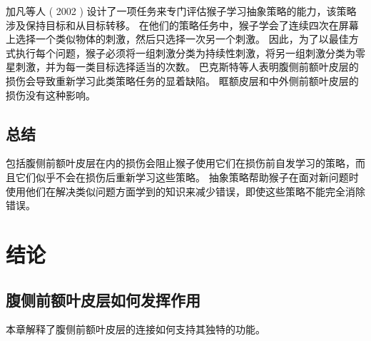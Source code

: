 加凡等人 ( 2002 ) 设计了一项任务来专门评估猴子学习抽象策略的能力，该策略涉及保持目标和从目标转移。
在他们的策略任务中，猴子学会了连续四次在屏幕上选择一个类似物体的刺激，然后只选择一次另一个刺激。
因此，为了以最佳方式执行每个问题，猴子必须将一组刺激分类为持续性刺激，将另一组刺激分类为零星刺激，并为每一类目标选择适当的次数。 
巴克斯特等人\cite{baxter2009ventrolateral}表明腹侧前额叶皮层的损伤会导致重新学习此类策略任务的显着缺陷。 
眶额皮层\cite{baxter2007orbital}和中外侧前额叶皮层\cite{baxter2008dorsolateral}的损伤没有这种影响。



\subsection{总结}
\par 
包括腹侧前额叶皮层在内的损伤会阻止猴子使用它们在损伤前自发学习的策略，而且它们似乎不会在损伤后重新学习这些策略。
抽象策略帮助猴子在面对新问题时使用他们在解决类似问题方面学到的知识来减少错误，即使这些策略不能完全消除错误。



\section{结论}

\subsection{腹侧前额叶皮层如何发挥作用}
\par

本章解释了腹侧前额叶皮层的连接如何支持其独特的功能。


